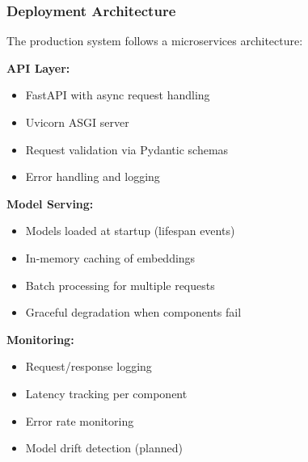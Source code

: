 \subsubsection{Deployment Architecture}

The production system follows a microservices architecture:

\textbf{API Layer:}
\begin{itemize}
    \item FastAPI with async request handling
    \item Uvicorn ASGI server
    \item Request validation via Pydantic schemas
    \item Error handling and logging
\end{itemize}

\textbf{Model Serving:}
\begin{itemize}
    \item Models loaded at startup (lifespan events)
    \item In-memory caching of embeddings
    \item Batch processing for multiple requests
    \item Graceful degradation when components fail
\end{itemize}

\textbf{Monitoring:}
\begin{itemize}
    \item Request/response logging
    \item Latency tracking per component
    \item Error rate monitoring
    \item Model drift detection (planned)
\end{itemize}

